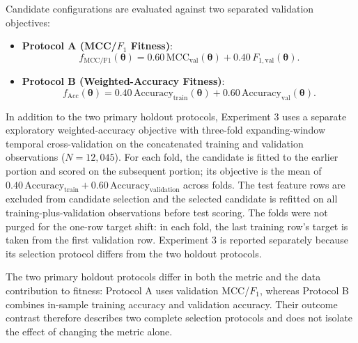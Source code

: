 Candidate configurations are evaluated against two separated validation objectives:
\begin{itemize}
    \item \textbf{Protocol A (MCC/$F_1$ Fitness)}:
    \begin{equation}\label{eq:fitness_protocol_a}
    f_{\mathrm{MCC/F1}}(\boldsymbol{\theta}) = 0.60\,\mathrm{MCC}_{\mathrm{val}}(\boldsymbol{\theta}) + 0.40\,F_{1,\mathrm{val}}(\boldsymbol{\theta}).
    \end{equation}
    \item \textbf{Protocol B (Weighted-Accuracy Fitness)}:
    \begin{equation}\label{eq:fitness_protocol_b}
    f_{\mathrm{Acc}}(\boldsymbol{\theta}) = 0.40\,\mathrm{Accuracy}_{\mathrm{train}}(\boldsymbol{\theta}) + 0.60\,\mathrm{Accuracy}_{\mathrm{val}}(\boldsymbol{\theta}).
    \end{equation}
\end{itemize}

In addition to the two primary holdout protocols, Experiment 3 uses a separate exploratory weighted-accuracy objective with three-fold expanding-window temporal cross-validation on the concatenated training and validation observations ($N=12{,}045$). For each fold, the candidate is fitted to the earlier portion and scored on the subsequent portion; its objective is the mean of $0.40\,\mathrm{Accuracy}_{\mathrm{train}}+0.60\,\mathrm{Accuracy}_{\mathrm{validation}}$ across folds. The test feature rows are excluded from candidate selection and the selected candidate is refitted on all training-plus-validation observations before test scoring. The folds were not purged for the one-row target shift: in each fold, the last training row's target is taken from the first validation row. Experiment 3 is reported separately because its selection protocol differs from the two holdout protocols.

The two primary holdout protocols differ in both the metric and the data contribution to fitness: Protocol A uses validation MCC/$F_1$, whereas Protocol B combines in-sample training accuracy and validation accuracy. Their outcome contrast therefore describes two complete selection protocols and does not isolate the effect of changing the metric alone.

